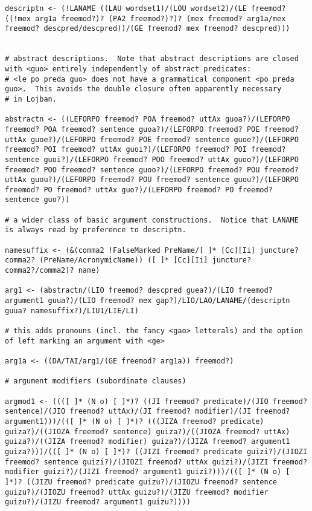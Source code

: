 \documentclass[12pt]{book}
\begin{document}
{\begin{verbatim}
descriptn <- (!LANAME ((LAU wordset1)/(LOU wordset2)/(LE freemod? ((!mex arg1a freemod?)? (PA2 freemod?)?)? (mex freemod? arg1a/mex freemod? descpred/descpred))/(GE freemod? mex freemod? descpred)))


# abstract descriptions.  Note that abstract descriptions are closed with <guo> entirely independently of abstract predicates:
# <le po preda guo> does not have a grammatical component <po preda guo>.  This avoids the double closure often apparently necessary
# in Lojban.

abstractn <- ((LEFORPO freemod? POA freemod? uttAx guoa?)/(LEFORPO freemod? POA freemod? sentence guoa?)/(LEFORPO freemod? POE freemod? uttAx guoe?)/(LEFORPO freemod? POE freemod? sentence guoe?)/(LEFORPO freemod? POI freemod? uttAx guoi?)/(LEFORPO freemod? POI freemod? sentence guoi?)/(LEFORPO freemod? POO freemod? uttAx guoo?)/(LEFORPO freemod? POO freemod? sentence guoo?)/(LEFORPO freemod? POU freemod? uttAx guou?)/(LEFORPO freemod? POU freemod? sentence guou?)/(LEFORPO freemod? PO freemod? uttAx guo?)/(LEFORPO freemod? PO freemod? sentence guo?))

# a wider class of basic argument constructions.  Notice that LANAME is always read by preference to descriptn.

namesuffix <- (&(comma2 !FalseMarked PreName/[ ]* [Cc][Ii] juncture? comma2? (PreName/AcronymicName)) ([ ]* [Cc][Ii] juncture? comma2?/comma2)? name)

arg1 <- (abstractn/(LIO freemod? descpred guea?)/(LIO freemod? argument1 guua?)/(LIO freemod? mex gap?)/LIO/LAO/LANAME/(descriptn guua? namesuffix?)/LIU1/LIE/LI)

# this adds pronouns (incl. the fancy <gao> letterals) and the option of left marking an argument with <ge>

arg1a <- ((DA/TAI/arg1/(GE freemod? arg1a)) freemod?)

# argument modifiers (subordinate clauses)

argmod1 <- ((([ ]* (N o) [ ]*)? ((JI freemod? predicate)/(JIO freemod? sentence)/(JIO freemod? uttAx)/(JI freemod? modifier)/(JI freemod? argument1)))/(([ ]* (N o) [ ]*)? (((JIZA freemod? predicate) guiza?)/((JIOZA freemod? sentence) guiza?)/((JIOZA freemod? uttAx) guiza?)/((JIZA freemod? modifier) guiza?)/(JIZA freemod? argument1 guiza?)))/(([ ]* (N o) [ ]*)? ((JIZI freemod? predicate guizi?)/(JIOZI freemod? sentence guizi?)/(JIOZI freemod? uttAx guizi?)/(JIZI freemod? modifier guizi?)/(JIZI freemod? argument1 guizi?)))/(([ ]* (N o) [ ]*)? ((JIZU freemod? predicate guizu?)/(JIOZU freemod? sentence guizu?)/(JIOZU freemod? uttAx guizu?)/(JIZU freemod? modifier guizu?)/(JIZU freemod? argument1 guizu?))))


\end{verbatim}}
\end{document}
